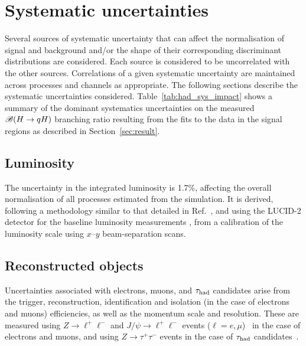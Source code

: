 \section{Systematic uncertainties}
\label{sec:systematics}
				   
Several sources of systematic uncertainty that can affect the normalisation of signal 
and background and/or the shape of their corresponding discriminant distributions are considered.
Each source is considered to be uncorrelated with the other sources.  
Correlations of a given systematic uncertainty are maintained across processes and channels 
as appropriate. The following sections describe the systematic uncertainties considered.
Table~\ref{tab:had_sys_impact} shows a summary of the dominant systematics uncertainties on the measured $\mathscr{B}(H\to qH)$ branching ratio
resulting from the fits to the data in the signal regions as described in Section~\ref{sec:result}.

\subsection{Luminosity}
\label{sec:syst_lumi}

The uncertainty in the integrated luminosity is 1.7\%, affecting the overall normalisation of all processes estimated from the simulation. 
It is derived, following a methodology similar to that detailed in Ref.~\cite{Aaboud:2016hhf}, and using the LUCID-2 detector 
for the baseline luminosity measurements \cite{Avoni:2018iuv}, from a calibration of the luminosity scale using $x$--$y$ beam-separation scans.

\subsection{Reconstructed objects}
\label{sec:syst_objects}

Uncertainties associated with electrons, muons, and $\tau_{\mathrm{had}}$ candidates arise from the trigger, reconstruction,  
identification and isolation (in the case of electrons and muons) efficiencies, as well as the momentum scale and resolution. 
These are measured using $Z\to \ell^+\ell^-$ and $J/\psi\to \ell^+\ell^-$ events ($\ell =e, \mu$)~\cite{ATLAS-CONF-2016-024,Aad:2016jkr} 
in the case of electrons and muons, and using $Z\to \tau^+\tau^-$ events in the case of $\tau_{\mathrm{had}}$ candidates~\cite{ATLAS-CONF-2017-029}.

